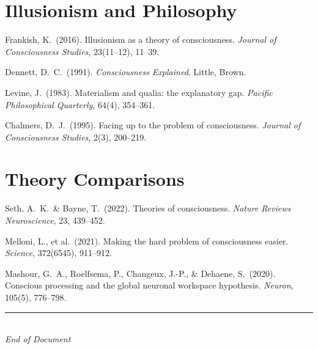 \documentclass[11pt,a4paper]{report}
\begin{document}
\section*{Illusionism and Philosophy}
\begin{enumerate}[label={[\arabic*]}, leftmargin=2.5em, start=18]
  \item Frankish, K.\ (2016). Illusionism as a theory of consciousness. \textit{Journal of Consciousness Studies}, 23(11--12), 11--39.
  \item Dennett, D.\ C.\ (1991). \textit{Consciousness Explained}. Little, Brown.
  \item Levine, J.\ (1983). Materialism and qualia: the explanatory gap. \textit{Pacific Philosophical Quarterly}, 64(4), 354--361.
  \item Chalmers, D.\ J.\ (1995). Facing up to the problem of consciousness. \textit{Journal of Consciousness Studies}, 2(3), 200--219.
\end{enumerate}

\section*{Theory Comparisons}
\begin{enumerate}[label={[\arabic*]}, leftmargin=2.5em, start=22]
  \item Seth, A.\ K.\ \& Bayne, T.\ (2022). Theories of consciousness. \textit{Nature Reviews Neuroscience}, 23, 439--452.
  \item Melloni, L., et al.\ (2021). Making the hard problem of consciousness easier. \textit{Science}, 372(6545), 911--912.
  \item Mashour, G.\ A., Roelfsema, P., Changeux, J.-P., \& Dehaene, S.\ (2020). Conscious processing and the global neuronal workspace hypothesis. \textit{Neuron}, 105(5), 776--798.
\end{enumerate}

\vfill
\begin{center}
  {\color{gray}\rule{0.4\textwidth}{0.5pt}}\\[8pt]
  {\small\color{gray}\itshape End of Document}
\end{center}
\end{document}
